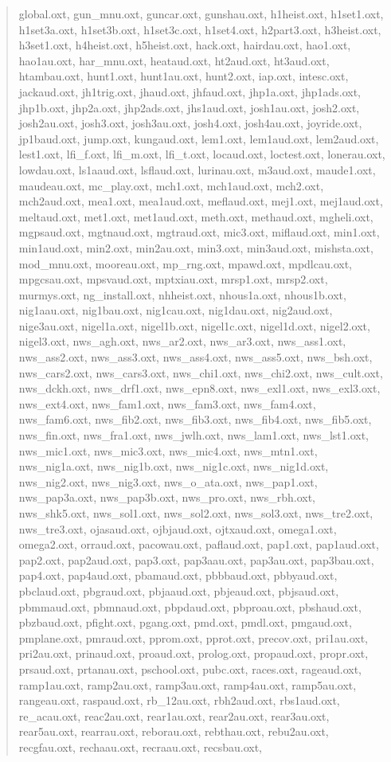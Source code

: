 \documentclass[]{scrartcl}
\begin{document}
\begin{quote}
global.oxt, gun\_mnu.oxt, guncar.oxt, gunshau.oxt, h1heist.oxt, h1set1.oxt, h1set3a.oxt, h1set3b.oxt, h1set3c.oxt, h1set4.oxt, h2part3.oxt, h3heist.oxt, h3set1.oxt, h4heist.oxt, h5heist.oxt, hack.oxt, hairdau.oxt, hao1.oxt, hao1au.oxt, har\_mnu.oxt, heataud.oxt, ht2aud.oxt, ht3aud.oxt, htambau.oxt, hunt1.oxt, hunt1au.oxt, hunt2.oxt, iap.oxt, intesc.oxt, jackaud.oxt, jh1trig.oxt, jhaud.oxt, jhfaud.oxt, jhp1a.oxt, jhp1ads.oxt, jhp1b.oxt, jhp2a.oxt, jhp2ads.oxt, jhs1aud.oxt, josh1au.oxt, josh2.oxt, josh2au.oxt, josh3.oxt, josh3au.oxt, josh4.oxt, josh4au.oxt, joyride.oxt, jp1baud.oxt, jump.oxt, kungaud.oxt, lem1.oxt, lem1aud.oxt, lem2aud.oxt, lest1.oxt, lfi\_f.oxt, lfi\_m.oxt, lfi\_t.oxt, locaud.oxt, loctest.oxt, lonerau.oxt, lowdau.oxt, ls1aaud.oxt, lsflaud.oxt, lurinau.oxt, m3aud.oxt, maude1.oxt, maudeau.oxt, mc\_play.oxt, mch1.oxt, mch1aud.oxt, mch2.oxt, mch2aud.oxt, mea1.oxt, mea1aud.oxt, meflaud.oxt, mej1.oxt, mej1aud.oxt, meltaud.oxt, met1.oxt, met1aud.oxt, meth.oxt, methaud.oxt, mgheli.oxt, mgpsaud.oxt, mgtnaud.oxt, mgtraud.oxt, mic3.oxt, miflaud.oxt, min1.oxt, min1aud.oxt, min2.oxt, min2au.oxt, min3.oxt, min3aud.oxt, mishsta.oxt, mod\_mnu.oxt, mooreau.oxt, mp\_rng.oxt, mpawd.oxt, mpdlcau.oxt, mpgcsau.oxt, mpsvaud.oxt, mptxiau.oxt, mrsp1.oxt, mrsp2.oxt, murmys.oxt, ng\_install.oxt, nhheist.oxt, nhous1a.oxt, nhous1b.oxt, nig1aau.oxt, nig1bau.oxt, nig1cau.oxt, nig1dau.oxt, nig2aud.oxt, nige3au.oxt, nigel1a.oxt, nigel1b.oxt, nigel1c.oxt, nigel1d.oxt, nigel2.oxt, nigel3.oxt, nws\_agh.oxt, nws\_ar2.oxt, nws\_ar3.oxt, nws\_ass1.oxt, nws\_ass2.oxt, nws\_ass3.oxt, nws\_ass4.oxt, nws\_ass5.oxt, nws\_bsh.oxt, nws\_cars2.oxt, nws\_cars3.oxt, nws\_chi1.oxt, nws\_chi2.oxt, nws\_cult.oxt, nws\_dckh.oxt, nws\_drf1.oxt, nws\_epn8.oxt, nws\_exl1.oxt, nws\_exl3.oxt, nws\_ext4.oxt, nws\_fam1.oxt, nws\_fam3.oxt, nws\_fam4.oxt, nws\_fam6.oxt, nws\_fib2.oxt, nws\_fib3.oxt, nws\_fib4.oxt, nws\_fib5.oxt, nws\_fin.oxt, nws\_fra1.oxt, nws\_jwlh.oxt, nws\_lam1.oxt, nws\_lst1.oxt, nws\_mic1.oxt, nws\_mic3.oxt, nws\_mic4.oxt, nws\_mtn1.oxt, nws\_nig1a.oxt, nws\_nig1b.oxt, nws\_nig1c.oxt, nws\_nig1d.oxt, nws\_nig2.oxt, nws\_nig3.oxt, nws\_o\_ata.oxt, nws\_pap1.oxt, nws\_pap3a.oxt, nws\_pap3b.oxt, nws\_pro.oxt, nws\_rbh.oxt, nws\_shk5.oxt, nws\_sol1.oxt, nws\_sol2.oxt, nws\_sol3.oxt, nws\_tre2.oxt, nws\_tre3.oxt, ojasaud.oxt, ojbjaud.oxt, ojtxaud.oxt, omega1.oxt, omega2.oxt, orraud.oxt, pacowau.oxt, paflaud.oxt, pap1.oxt, pap1aud.oxt, pap2.oxt, pap2aud.oxt, pap3.oxt, pap3aau.oxt, pap3au.oxt, pap3bau.oxt, pap4.oxt, pap4aud.oxt, pbamaud.oxt, pbbbaud.oxt, pbbyaud.oxt, pbclaud.oxt, pbgraud.oxt, pbjaaud.oxt, pbjeaud.oxt, pbjsaud.oxt, pbmmaud.oxt, pbmnaud.oxt, pbpdaud.oxt, pbproau.oxt, pbshaud.oxt, pbzbaud.oxt, pfight.oxt, pgang.oxt, pmd.oxt, pmdl.oxt, pmgaud.oxt, pmplane.oxt, pmraud.oxt, pprom.oxt, pprot.oxt, precov.oxt, pri1au.oxt, pri2au.oxt, prinaud.oxt, proaud.oxt, prolog.oxt, propaud.oxt, propr.oxt, prsaud.oxt, prtanau.oxt, pschool.oxt, pubc.oxt, races.oxt, rageaud.oxt, ramp1au.oxt, ramp2au.oxt, ramp3au.oxt, ramp4au.oxt, ramp5au.oxt, rangeau.oxt, raspaud.oxt, rb\_12au.oxt, rbh2aud.oxt, rbs1aud.oxt, re\_acau.oxt, reac2au.oxt, rear1au.oxt, rear2au.oxt, rear3au.oxt, rear5au.oxt, rearrau.oxt, reborau.oxt, rebthau.oxt, rebu2au.oxt, recgfau.oxt, rechaau.oxt, recraau.oxt, recsbau.oxt, 
\end{quote}
\end{document}
